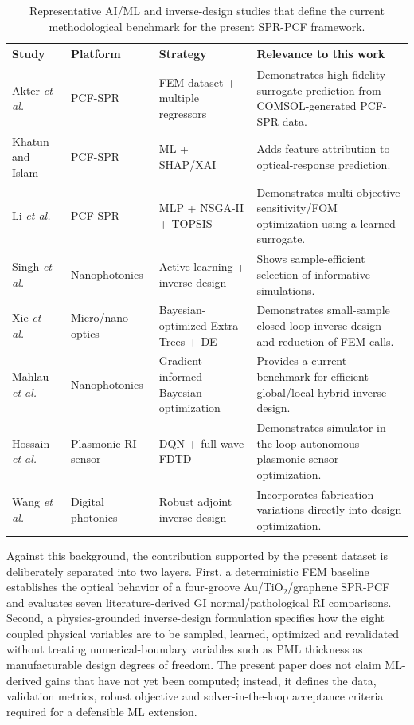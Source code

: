 \documentclass[5p,times,twocolumn]{elsarticle}
\newcommand{\etal}{\textit{et al.}}
\begin{document}
\begin{table}[!t]
\centering
\caption{Representative AI/ML and inverse-design studies that define the current methodological benchmark for the present SPR-PCF framework.}
\label{tab:recent_ml_literature}
\scriptsize
\renewcommand{\arraystretch}{1.10}
\begin{tabularx}{\textwidth}{p{} p{} p{} X}
\toprule
\textbf{Study} & \textbf{Platform} & \textbf{Strategy} & \textbf{Relevance to this work} \\
\midrule
Akter \etal~\cite{Akter2025MLPCF} & PCF-SPR & FEM dataset + multiple regressors & Demonstrates high-fidelity surrogate prediction from COMSOL-generated PCF-SPR data. \\
Khatun and Islam~\cite{Khatun2025XAI} & PCF-SPR & ML + SHAP/XAI & Adds feature attribution to optical-response prediction. \\
Li \etal~\cite{Li2025MLMultiObjective} & PCF-SPR & MLP + NSGA-II + TOPSIS & Demonstrates multi-objective sensitivity/FOM optimization using a learned surrogate. \\
Singh \etal~\cite{Singh2025ActiveLearning} & Nanophotonics & Active learning + inverse design & Shows sample-efficient selection of informative simulations. \\
Xie \etal~\cite{Xie2026SmallSample} & Micro/nano optics & Bayesian-optimized Extra Trees + DE & Demonstrates small-sample closed-loop inverse design and reduction of FEM calls. \\
Mahlau \etal~\cite{Mahlau2026BONNI} & Nanophotonics & Gradient-informed Bayesian optimization & Provides a current benchmark for efficient global/local hybrid inverse design. \\
Hossain \etal~\cite{Hossain2026DeepRL} & Plasmonic RI sensor & DQN + full-wave FDTD & Demonstrates simulator-in-the-loop autonomous plasmonic-sensor optimization. \\
Wang \etal~\cite{Wang2025RobustID} & Digital photonics & Robust adjoint inverse design & Incorporates fabrication variations directly into design optimization. \\
\bottomrule
\end{tabularx}
\end{table}

Against this background, the contribution supported by the present dataset is deliberately separated into two layers. First, a deterministic FEM baseline establishes the optical behavior of a four-groove Au/TiO$_2$/graphene SPR-PCF and evaluates seven literature-derived GI normal/pathological RI comparisons. Second, a physics-grounded inverse-design formulation specifies how the eight coupled physical variables are to be sampled, learned, optimized and revalidated without treating numerical-boundary variables such as PML thickness as manufacturable design degrees of freedom. The present paper does not claim ML-derived gains that have not yet been computed; instead, it defines the data, validation metrics, robust objective and solver-in-the-loop acceptance criteria required for a defensible ML extension.
\end{document}
